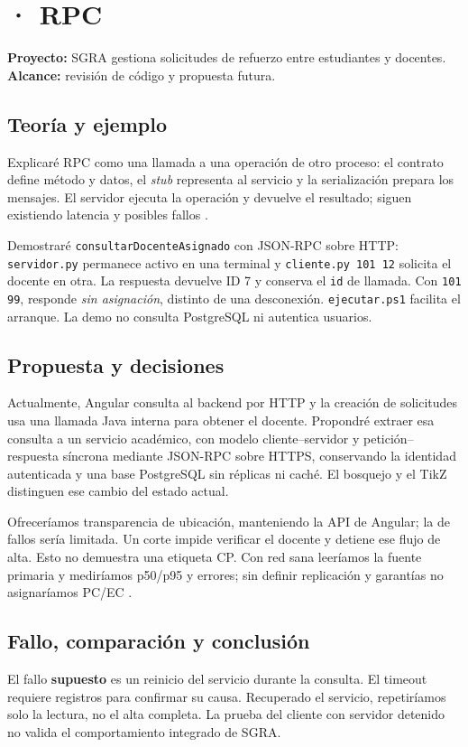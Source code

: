 \section*{\personaUno{} · RPC}
\textbf{Proyecto:} SGRA gestiona solicitudes de refuerzo entre estudiantes y docentes. \textbf{Alcance:} revisión de código y propuesta futura.

\subsection*{Teoría y ejemplo}
Explicaré RPC como una llamada a una operación de otro proceso: el contrato define método y datos, el \emph{stub} representa al servicio y la serialización prepara los mensajes. El servidor ejecuta la operación y devuelve el resultado; siguen existiendo latencia y posibles fallos \cite{zhang2023rpc,arcuri2025evomaster}.

Demostraré \texttt{consultarDocenteAsignado} con JSON-RPC sobre HTTP: \texttt{servidor.py} permanece activo en una terminal y \texttt{cliente.py 101 12} solicita el docente en otra. La respuesta devuelve ID 7 y conserva el \texttt{id} de llamada. Con \texttt{101 99}, responde \emph{sin asignación}, distinto de una desconexión. \texttt{ejecutar.ps1} facilita el arranque. La demo no consulta PostgreSQL ni autentica usuarios.

\subsection*{Propuesta y decisiones}
Actualmente, Angular consulta al backend por HTTP y la creación de solicitudes usa una llamada Java interna para obtener el docente. Propondré extraer esa consulta a un servicio académico, con modelo cliente--servidor y petición--respuesta síncrona mediante JSON-RPC sobre HTTPS, conservando la identidad autenticada y una base PostgreSQL sin réplicas ni caché. El bosquejo y el TikZ distinguen ese cambio del estado actual.

Ofreceríamos transparencia de ubicación, manteniendo la API de Angular; la de fallos sería limitada. Un corte impide verificar el docente y detiene ese flujo de alta. Esto no demuestra una etiqueta CP. Con red sana leeríamos la fuente primaria y mediríamos p50/p95 y errores; sin definir replicación y garantías no asignaríamos PC/EC \cite{ahmed2023consistency}.

\subsection*{Fallo, comparación y conclusión}
El fallo \textbf{supuesto} es un reinicio del servicio durante la consulta. El timeout requiere registros para confirmar su causa. Recuperado el servicio, repetiríamos solo la lectura, no el alta completa. La prueba del cliente con servidor detenido no valida el comportamiento integrado de SGRA.

